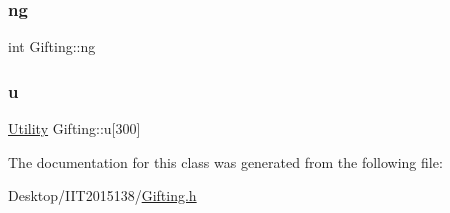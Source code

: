 \mbox{\label{classGifting_a7809d37f157e44f790f5e0f921ce6b92}} 
\subsubsection{\texorpdfstring{ng}{ng}}
{\footnotesize\ttfamily int Gifting\+::ng\hspace{0.3cm}{\ttfamily [private]}}

\mbox{\label{classGifting_ac68eb228c394203ff3c5fb6d18198a88}} 
\subsubsection{\texorpdfstring{u}{u}}
{\footnotesize\ttfamily \hyperlink{classUtility}{Utility} Gifting\+::u\mbox{[}300\mbox{]}\hspace{0.3cm}{\ttfamily [private]}}



The documentation for this class was generated from the following file\+:\begin{DoxyCompactItemize}
\item 
Desktop/\+I\+I\+T2015138/\hyperlink{Gifting_8h}{Gifting.\+h}\end{DoxyCompactItemize}
